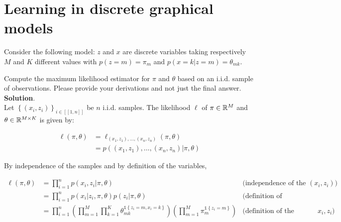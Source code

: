 \documentclass[a4paper, 11pt]{article}
\begin{document}

\maketitle

\section{Learning in discrete graphical models}

Consider the following model: $z$ and $x$ are discrete variables taking respectively $M$ and $K$ different values with $p(z=m) = \pi_m$ and $p(x=k|z=m) = \theta_{mk}$.

Compute the maximum likelihood estimator for $\pi$ and $\theta$ based on an i.i.d. sample of observations. Please provide your derivations and not just the final answer. \\

\textbf{Solution}. \\

Let $\left\{ (x_i, z_i) \right\}_{i \in [\![ 1, n ]\!]}$ be $n$ i.i.d. samples. The likelihood $\ell$ of $\pi \in \mathbb{R}^{M}$ and $\theta \in \mathbb{R}^{M \times K}$ is given by:

\begin{equation*}
    \begin{aligned}
    \ell \left( \pi, \theta \right) &= \ell_{(x_1, z_1), \dots, (x_n, z_n)}(\pi, \theta) \\
    &= p \left( (x_1, z_1), \dots, (x_n, z_n) | \pi, \theta \right)
    \end{aligned}
\end{equation*}
\vspace*{.6em}

By independence of the samples and by definition of the variables,

\begin{equation*}
    \begin{aligned}
    \ell \left( \pi, \theta \right) &= \prod_{i=1}^{n} p \left( x_i, z_i | \pi, \theta \right) & \text{(independence of the $(x_i, z_i)$)} \\
    &= \prod_{i=1}^{n} p \left( x_i | z_i, \pi, \theta \right) p \left( z_i | \pi, \theta \right) & \text{(definition of conditional distribution)} \\
    &= \prod_{i=1}^{n} \left( \prod_{m=1}^{M} \prod_{k=1}^{K} \theta_{mk}^{\mathds{1} \left\{ z_i = m, x_i = k \right\}} \right) \left( \prod_{m=1}^{M} \pi_{m}^{\mathds{1} \left\{ z_i = m \right\}} \right) & \text{(definition of the variables $x_i, z_i$)}
    \end{aligned}
\end{equation*}
\vspace*{.6em}
\end{document}
